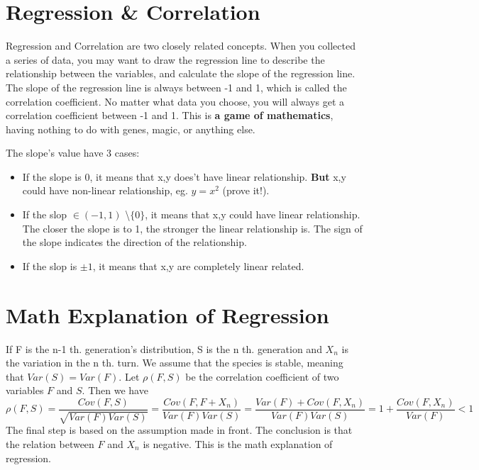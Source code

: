 \documentclass[a4paper]{article}
\begin{document}
\section{Regression \& Correlation}
Regression and Correlation are two closely related concepts. When you collected a series of data, you may want to draw the regression line to describe the relationship between the variables, and calculate the slope of the regression line. The slope of the regression line is always between -1 and 1, which is called the correlation coefficient. No matter what data you choose, you will always get a correlation coefficient between -1 and 1. This is \textbf{a game of mathematics}, having nothing to do with genes, magic, or anything else. \par 
The slope's value have 3 cases:
\begin{itemize}
    \item If the slope is 0, it means that x,y does't have linear relationship. \textbf{But} x,y could have non-linear relationship, eg. $y=x^2$ (prove it!).
    \item If the slop $\in (-1,1)$ \textbackslash $\{0\}$, it means that x,y could have linear relationship. The closer the slope is to 1, the stronger the linear relationship is. The sign of the slope indicates the direction of the relationship.
    \item If the slop is $\pm 1$, it means that x,y are completely linear related.
\end{itemize}
\section{Math Explanation of Regression}
If F is the n-1 th. generation's distribution, S is the n th. generation and $X_n$ is the variation in the n th. turn. We assume that the species is stable, meaning that $Var(S)=Var(F)$. Let $\rho (F,S)$ be the correlation coefficient of two variables $F$ and $S$. Then we have 
$$ \rho(F,S)=\frac{Cov(F,S)}{\sqrt{Var(F)Var(S)}} = \frac{Cov(F,F+X_n)}{Var(F)Var(S)}=\frac{Var(F)+Cov(F,X_n)}{Var(F)Var(S)}=1+\frac{Cov(F,X_n)}{Var(F)}<1$$
The final step is based on the assumption made in front. The conclusion is that the relation between $F$ and $X_n$ is negative. This is the math explanation of regression. \par
\end{document}
